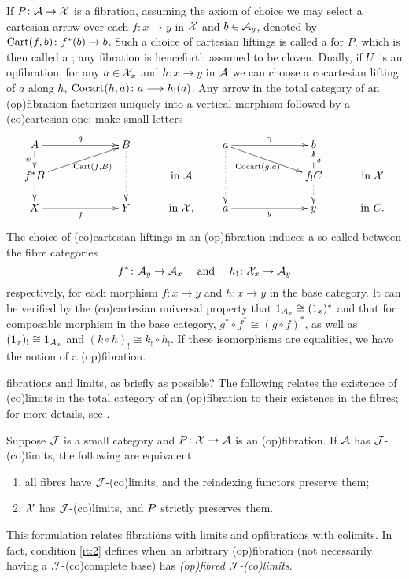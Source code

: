 \documentclass{amsart}
\begin{document}
If $P\colon \A \to\X$ is a fibration, assuming the axiom of choice we may select a cartesian arrow over each $f\colon x\to y$ in $\X$ and $b\in\A _y$, denoted by $\Cart(f,b)\colon f^*(b)\to b$. Such a choice of cartesian liftings is called a  for $P$, which is then called a ; any fibration is henceforth assumed to be cloven. Dually, if $\U$ is an opfibration, for any $a\in\D _x$ and $h \colon x \to y$ in $\C$ we can choose a cocartesian lifting of $a$ along $h$, $\Cocart(h,a)\colon a\longrightarrow h_!(a)$. 
Any arrow in the total category of an (op)fibration factorizes uniquely into
a vertical morphism followed by a (co)cartesian one: {\chris make small letters}
\begin{equation}\label{factor}
\xymatrix @C=.4in @R=.2in
{A\ar[rr]^\theta\ar @{-->}[d]_-{\psi} && B \ar @{.>}[dd] &\\
f^*B\ar[urr]_-{\;\Cart(f,B)} \ar @{.>}[d] &&& \textrm{in }\A  \\
X\ar[rr]_-{f} && Y & \textrm{in }\X,}\qquad
\xymatrix @C=.4in @R=.2in
{a \ar @{.>}[dd]\ar[rr]^\gamma \ar[drr]_-{\Cocart(g,a)} && b &\\
&& f_!C \ar @{-->}[u]_-{\delta} \ar @{.>}[d] & \textrm{in }\D  \\
a\ar[rr]_-{g} && y & \textrm{in }C.}
\end{equation}
The choice of (co)cartesian liftings in an (op)fibration induces a so-called  between the fibre categories
\begin{equation}\label{reindexing}
    f^*\colon \A _y\to\A _x\quad\textrm{ and }\quad h_!\colon\D _x\to\C _y
\end{equation}
respectively, for each morphism $f\colon x\to y$ and $h\colon x\to y$ in the base category.
It can be verified by the (co)cartesian universal property that $1_{\A _x}\cong(1_x)^*$ 
and that for composable morphism in the base category, $g^*\circ f^*\cong(g\circ f)^* $, as well as $(1_x)_!\cong1_{\A_x}$ and $(k\circ h)_!\cong k_!\circ h_!$. If these isomorphisms are equalities, we have the notion of a  (op)fibration.

{\chris fibrations and limits, as briefly as possible?}
The following relates the existence of (co)limits in the total category of an (op)fibration to their existence in the fibres; for more details, see \cite{hermidaphd}.

\begin{lem}\label{lem:fibrewiselimits}
Suppose $\ca{J}$ is a small category and $\P\colon\X\to\A$ is an (op)fibration. If $\A$ has $\ca{J}$-(co)limits,
the following are equivalent:
\begin{enumerate}
 \item all fibres have $\ca{J}$-(co)limits, and the reindexing functors preserve them;
 \item $\X$ has $\ca{J}$-(co)limits, and $\P$ strictly preserves them.\label{it:2}
\end{enumerate}
\end{lem}
This formulation relates fibrations with limits and opfibrations with colimits.
In fact, condition \ref{it:2} defines when an arbitrary (op)fibration (not necessarily having a $\ca{J}$-(co)complete base) has \emph{(op)fibred $\ca{J}$-(co)limits}.
\end{document}
